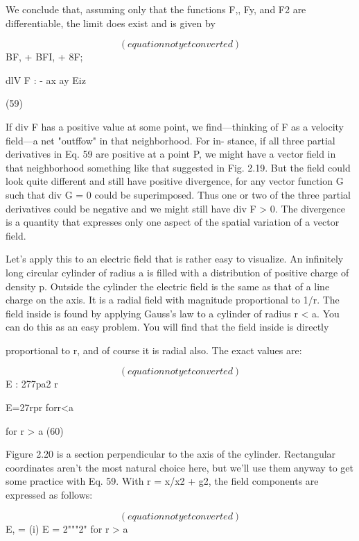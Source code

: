 We conclude that, assuming only that the functions F,, Fy, and F2
are differentiable, the limit does exist and is given by

\begin{equation}
(equation not yet converted)
\end{equation}
BF, + BFI, + 8F;

dlV F : -
ax ay Eiz

(59)

If div F has a positive value at some point, we find---thinking of F
as a velocity field---a net "outffow" in that neighborhood. For in-
stance, if all three partial derivatives in Eq. 59 are positive at a
point P, we might have a vector field in that neighborhood something
like that suggested in Fig. 2.19. But the field could look quite different
and still have positive divergence, for any vector function G
such that div G = 0 could be superimposed. Thus one or two of the
three partial derivatives could be negative and we might still have
div F > 0. The divergence is a quantity that expresses only one
aspect of the spatial variation of a vector field.

Let's apply this to an electric field that is rather easy to visualize.
An infinitely long circular cylinder of radius a is filled with a distribution
of positive charge of density p. Outside the cylinder the electric
field is the same as that of a line charge on the axis. It is a radial
field with magnitude proportional to 1/r. The field inside is found
by applying Gauss's law to a cylinder of radius r < a. You can do
this as an easy problem. You will find that the field inside is directly

proportional to r, and of course it is radial also. The exact values
are:

\begin{equation}
(equation not yet converted)
\end{equation}
E : 277pa2
r

E=27rpr forr<a

for r > a
(60)

Figure 2.20 is a section perpendicular to the axis of the cylinder.
Rectangular coordinates aren't the most natural choice here, but
we'll use them anyway to get some practice with Eq. 59. With
r = x/x2 + g2, the field components are expressed as follows:

\begin{equation}
(equation not yet converted)
\end{equation}
E, = (i) E = 2"""2" for r > a

